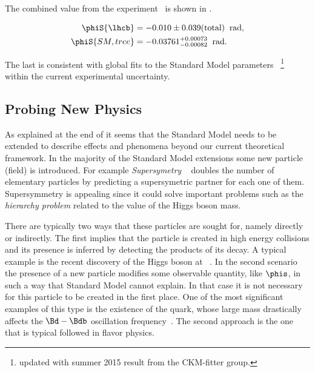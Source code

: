 \noindent The combined \phis value from the \lhcb experiment~\cite{phis-3fb-paper} is shown in .

\begin{subequations}
  \begin{align}
  \centering
  \phiS{\lhcb}           &=  -0.010 \pm 0.039(\text{total})  \;\; \text{rad},
  \label{phis_lhcb}\\
  \phiS{SM,tree}  &= -0.03761 {}^{+0.00073}_{-0.00082}  \;\; \text{rad}.
  \label{phis_theo}
\end{align}
\end{subequations}

\noindent The last is consistent with global fits to the Standard Model parameters ~\cite{ckm-fitter-phis-pred}\footnote{updated with summer 2015 result from the CKM-fitter group.}
 within the current experimental uncertainty.

\subsection{Probing New Physics}
\label{probe_new_phys}

As explained at the end of  it seems that the Standard Model needs to be extended
to describe effects and phenomena beyond our current theoretical framework. In the majority of the Standard Model
extensions some new particle (field) is introduced. For example {\it Supersymetry} ~\cite{Golfand:1971iw,Volkov:1973ix,Wess:1974tw}
doubles the number of elementary particles by predicting a supersymetric partner for each one of them.
Supersymmetry is appealing since it could solve important problems such as the {\it hierarchy problem}
related to the value of the Higgs boson mass.

There are typically two ways that these particles are sought for, namely directly or indirectly. The first implies
that the particle is created in high energy collisions and its presence is inferred by detecting the products of
its decay. A typical example is the recent discovery of the Higgs boson at \lhc~\cite{higgs-cms,higgs-atlas}.
In the second scenario the presence of a new particle modifies some observable quantity, like $\phis$, in such a way that Standard Model
cannot explain. In that case it is not necessary for this particle to be created in the first place.
One of the most significant examples of this type is the existence of the \tquark quark, whose large mass
drastically affects the $\Bd-\Bdb$ oscillation frequency~\cite{argus-bbmix}. The second approach is the one
that is typical followed in flavor physics.

